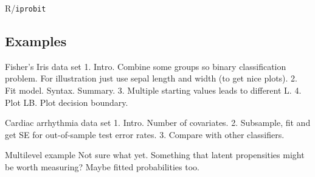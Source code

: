 \begin{frame}{R/\texttt{iprobit}}
\end{frame}

\subsection{Examples}

\begin{frame}{Fisher's Iris data set}
1. Intro. Combine some groups so binary classification problem. For illustration just use sepal length and width (to get nice plots).
2. Fit model. Syntax. Summary.
3. Multiple starting values leads to different L.
4. Plot LB. Plot decision boundary.
\end{frame}

\begin{frame}{Cardiac arrhythmia data set}
1. Intro. Number of covariates.
2. Subsample, fit and get SE for out-of-sample test error rates.
3. Compare with other classifiers.
\end{frame}

\begin{frame}{Multilevel example}
Not sure what yet. Something that latent propensities might be worth measuring? Maybe fitted probabilities too.
\end{frame}
















